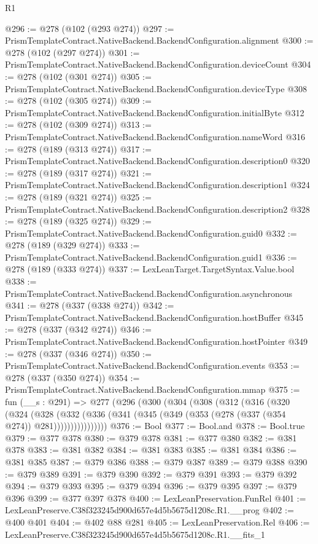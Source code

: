 \begin{lexlean}{R1}
\begin{coremodule}
@296 := @278 (@102 (@293 @274))
@297 := PrismTemplateContract.NativeBackend.BackendConfiguration.alignment
@300 := @278 (@102 (@297 @274))
@301 := PrismTemplateContract.NativeBackend.BackendConfiguration.deviceCount
@304 := @278 (@102 (@301 @274))
@305 := PrismTemplateContract.NativeBackend.BackendConfiguration.deviceType
@308 := @278 (@102 (@305 @274))
@309 := PrismTemplateContract.NativeBackend.BackendConfiguration.initialByte
@312 := @278 (@102 (@309 @274))
@313 := PrismTemplateContract.NativeBackend.BackendConfiguration.nameWord
@316 := @278 (@189 (@313 @274))
@317 := PrismTemplateContract.NativeBackend.BackendConfiguration.description0
@320 := @278 (@189 (@317 @274))
@321 := PrismTemplateContract.NativeBackend.BackendConfiguration.description1
@324 := @278 (@189 (@321 @274))
@325 := PrismTemplateContract.NativeBackend.BackendConfiguration.description2
@328 := @278 (@189 (@325 @274))
@329 := PrismTemplateContract.NativeBackend.BackendConfiguration.guid0
@332 := @278 (@189 (@329 @274))
@333 := PrismTemplateContract.NativeBackend.BackendConfiguration.guid1
@336 := @278 (@189 (@333 @274))
@337 := LexLeanTarget.TargetSyntax.Value.bool
@338 := PrismTemplateContract.NativeBackend.BackendConfiguration.asynchronous
@341 := @278 (@337 (@338 @274))
@342 := PrismTemplateContract.NativeBackend.BackendConfiguration.hostBuffer
@345 := @278 (@337 (@342 @274))
@346 := PrismTemplateContract.NativeBackend.BackendConfiguration.hostPointer
@349 := @278 (@337 (@346 @274))
@350 := PrismTemplateContract.NativeBackend.BackendConfiguration.events
@353 := @278 (@337 (@350 @274))
@354 := PrismTemplateContract.NativeBackend.BackendConfiguration.mmap
@375 := fun (__s : @291) =>
  @277
    (@296
      (@300
        (@304
          (@308
            (@312
              (@316
                (@320
                  (@324
                    (@328
                      (@332
                        (@336 (@341 (@345 (@349 (@353 (@278 (@337 (@354 @274)) @281))))))))))))))))
@376 := Bool
@377 := Bool.and
@378 := Bool.true
@379 := @377 @378
@380 := @379 @378
@381 := @377 @380
@382 := @381 @378
@383 := @381 @382
@384 := @381 @383
@385 := @381 @384
@386 := @381 @385
@387 := @379 @386
@388 := @379 @387
@389 := @379 @388
@390 := @379 @389
@391 := @379 @390
@392 := @379 @391
@393 := @379 @392
@394 := @379 @393
@395 := @379 @394
@396 := @379 @395
@397 := @379 @396
@399 := @377 @397 @378
@400 := LexLeanPreservation.FunRel
@401 := LexLeanPreserve.C38f323245d900d657e4d5b5675d1208c.R1.__prog
@402 := @400 @401
@404 := @402 @88 @281
@405 := LexLeanPreservation.Rel
@406 := LexLeanPreserve.C38f323245d900d657e4d5b5675d1208c.R1.__fits_1

\end{coremodule}
\end{lexlean}
